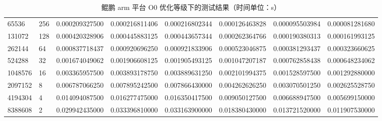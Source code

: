 \documentclass[a4paper]{article}
\begin{document}
\begin{table}[]
{\begin{tabular}{llllllll}
      65536   & 256     & 0.000209327500 & 0.000216811406 & 0.000216802344  & 0.000126463828 & 0.000095503984 & 0.000081281680 \\
      131072  & 128     & 0.000420328906 & 0.000445883125 & 0.000443657344  & 0.000262364766 & 0.000190380313 & 0.000161993125 \\
      262144  & 64      & 0.000837718437 & 0.000920696250 & 0.000921833906  & 0.000523046875 & 0.000381293437 & 0.000323660625 \\
      524288  & 32      & 0.001674049062 & 0.001906608125 & 0.001905493125  & 0.001047207187 & 0.000762858438 & 0.000648234062 \\
      1048576 & 16      & 0.003365957500 & 0.003893178750 & 0.003889631250  & 0.002101994375 & 0.001528597500 & 0.001292880000 \\
      2097152 & 8       & 0.006787066250 & 0.007895242500 & 0.007866430000  & 0.004262626250 & 0.003070501250 & 0.002625528750 \\
      4194304 & 4       & 0.014094087500 & 0.016277475000 & 0.016350417500  & 0.009050127500 & 0.006688947500 & 0.005699150000 \\
      8388608 & 2       & 0.029942435000 & 0.033396810000 & 0.033163900000  & 0.018380430000 & 0.013721520000 & 0.011907530000
    \end{tabular}%
  }
  \caption{鲲鹏 arm 平台 O0 优化等级下的测试结果（时间单位：s）}
  \label{tab:arm-O0-test}
\end{table}
\end{document}
